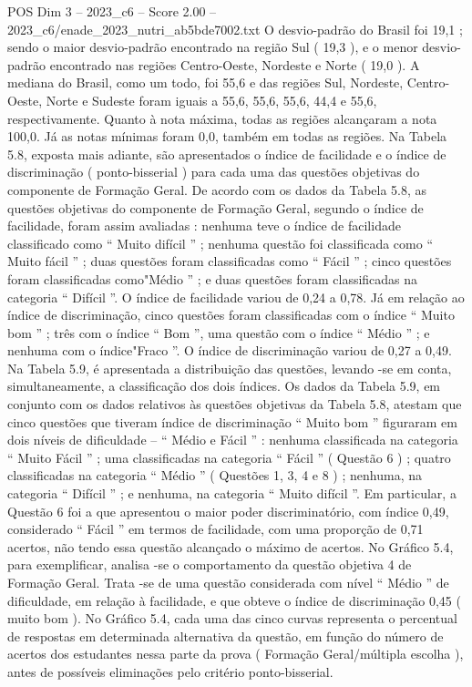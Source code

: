 \begin{textsample}{POS Dim 3 – 2023\_c6 – Score 2.00 – 2023\_c6/enade\_2023\_nutri\_ab5bde7002.txt}
O desvio-padrão do Brasil foi 19,1 ; sendo o maior desvio-padrão encontrado na região Sul ( 19,3 ), e o menor desvio-padrão encontrado nas regiões Centro-Oeste, Nordeste e Norte ( 19,0 ).
A mediana do Brasil, como um todo, foi 55,6 e das regiões Sul, Nordeste, Centro-Oeste, Norte e Sudeste foram iguais a 55,6, 55,6, 55,6, 44,4 e 55,6, respectivamente.
Quanto à nota máxima, todas as regiões alcançaram a nota 100,0.
Já as notas mínimas foram 0,0, também em todas as regiões.
Na Tabela 5.8, exposta mais adiante, são apresentados o índice de facilidade e o índice de discriminação ( ponto-bisserial ) para cada uma das questões objetivas do componente de Formação Geral.
De acordo com os dados da Tabela 5.8, as questões objetivas do componente de Formação Geral, segundo o índice de facilidade, foram assim avaliadas : nenhuma teve o índice de facilidade classificado como “ Muito difícil ” ; nenhuma questão foi classificada como “ Muito fácil ” ; duas questões foram classificadas como “ Fácil ” ; cinco questões foram classificadas como"Médio ” ; e duas questões foram classificadas na categoria “ Difícil ”.
O índice de facilidade variou de 0,24 a 0,78.
Já em relação ao índice de discriminação, cinco questões foram classificadas com o índice “ Muito bom ” ; três com o índice “ Bom ”, uma questão com o índice “ Médio ” ; e nenhuma com o índice"Fraco ”.
O índice de discriminação variou de 0,27 a 0,49.
Na Tabela 5.9, é apresentada a distribuição das questões, levando -se em conta, simultaneamente, a classificação dos dois índices.
Os dados da Tabela 5.9, em conjunto com os dados relativos às questões objetivas da Tabela 5.8, atestam que cinco questões que tiveram índice de discriminação “ Muito bom ” figuraram em dois níveis de dificuldade – “ Médio e Fácil ” : nenhuma classificada na categoria “ Muito Fácil ” ; uma classificadas na categoria “ Fácil ” ( Questão 6 ) ; quatro classificadas na categoria “ Médio ” ( Questões 1, 3, 4 e 8 ) ; nenhuma, na categoria “ Difícil ” ; e nenhuma, na categoria “ Muito difícil ”.
Em particular, a Questão 6 foi a que apresentou o maior poder discriminatório, com índice 0,49, considerado “ Fácil ” em termos de facilidade, com uma proporção de 0,71 acertos, não tendo essa questão alcançado o máximo de acertos.
No Gráfico 5.4, para exemplificar, analisa -se o comportamento da questão objetiva 4 de Formação Geral.
Trata -se de uma questão considerada com nível “ Médio ” de dificuldade, em relação à facilidade, e que obteve o índice de discriminação 0,45 ( muito bom ).
No Gráfico 5.4, cada uma das cinco curvas representa o percentual de respostas em determinada alternativa da questão, em função do número de acertos dos estudantes nessa parte da prova ( Formação Geral/múltipla escolha ), antes de possíveis eliminações pelo critério ponto-bisserial.

\end{textsample}
